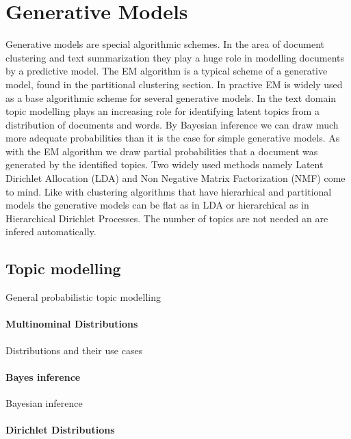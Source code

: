 \section{Generative Models}    

  Generative models are special algorithmic schemes. In the area of document clustering and text summarization they play a huge role in modelling documents by a predictive model.
  The EM algorithm is a typical scheme of a generative model, found in the partitional clustering section. In practive EM is widely used as a base algorithmic scheme for several generative models. In the text domain topic modelling plays an increasing role for identifying latent topics from a distribution of documents and words. By Bayesian inference we can draw much more adequate probabilities than it is the case for simple generative models. As with the EM algorithm we draw partial probabilities that a document was generated by the identified topics. Two widely used methods namely Latent Dirichlet Allocation (LDA) and Non Negative Matrix Factorization (NMF) come to mind. Like with clustering algorithms that have hierarhical and partitional models the generative models can be flat as in LDA or hierarchical as in Hierarchical Dirichlet Processes. The number of topics are not needed an are infered automatically.

  \subsection{Topic modelling}
    \cite{blei2011introduction, SemanticTopicModels2011, TopicModelsBlei2012, ProbTopicModelsSteyvers2006}
    General probabilistic topic modelling

    \paragraph{Multinominal Distributions}

      Distributions and their use cases

    \paragraph{Bayes inference}

      Bayesian inference

    \paragraph{Dirichlet Distributions}

